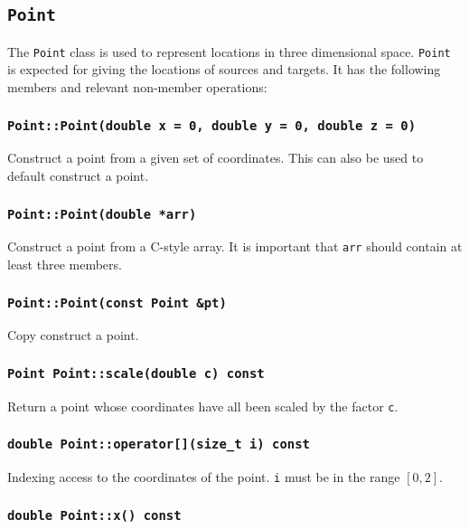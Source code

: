 \subsection{\texttt{Point}}
The \texttt{Point} class is used to represent locations in three dimensional
space. \texttt{Point} is expected for giving the locations of sources and
targets. It has the following members and relevant non-member operations:

\subsubsection{\texttt{Point::Point(double x = 0, double y = 0, double z = 0)}}

Construct a point from a given set of coordinates. This can also be used to
default construct a point.

\subsubsection{\texttt{Point::Point(double *arr)}}

Construct a point from a C-style array. It is  important that \texttt{arr}
should contain at least three members.

\subsubsection{\texttt{Point::Point(const Point \&pt)}}

Copy construct a point.

\subsubsection{\texttt{Point Point::scale(double c) const}}

Return a point whose coordinates have  all been scaled by the factor \texttt{c}.

\subsubsection{\texttt{double Point::operator[](size\_t i) const}}

Indexing access to the coordinates of the point. \texttt{i} must be in the
range $[0,2]$.

\subsubsection{\texttt{double Point::x() const}}

